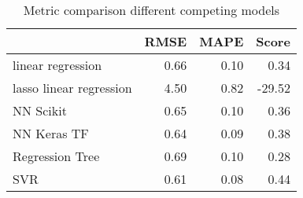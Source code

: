 \begin{table}[h!]
\centering
\caption{Metric comparison different competing models}
\label{tab:model_results}
\begin{tabular}{lrrr}
\toprule
{} &  RMSE &  MAPE &  Score \\
\midrule
linear regression       &  0.66 &  0.10 &   0.34 \\
lasso linear regression &  4.50 &  0.82 & -29.52 \\
NN Scikit               &  0.65 &  0.10 &   0.36 \\
NN Keras TF             &  0.64 &  0.09 &   0.38 \\
Regression Tree         &  0.69 &  0.10 &   0.28 \\
SVR                     &  0.61 &  0.08 &   0.44 \\
\bottomrule
\end{tabular}
\end{table}

